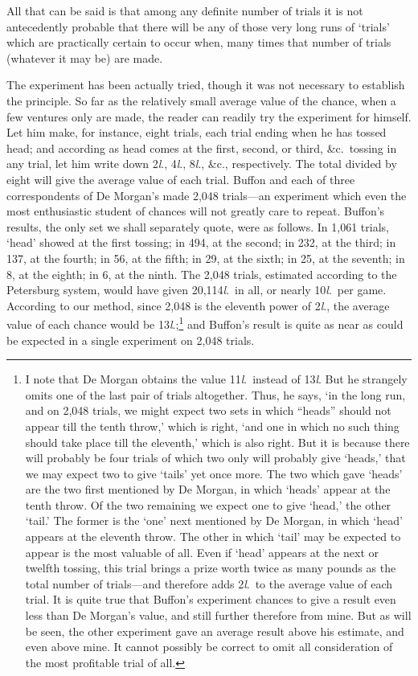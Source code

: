 \documentclass[letterpaper,12pt,oneside,openany]{memoir}
\begin{document}
All that can be said is that among any definite number
of trials it is not antecedently probable that there
will be any of those very long runs of `trials' which are
practically certain to occur when, many times that
number of trials (whatever it may be) are made.

The experiment has been actually tried, though it
was not necessary to establish the principle. So far as
the relatively small average value of the chance, when
a few ventures only are made, the reader can readily
try the experiment for himself. Let him make, for
instance, eight trials, each trial ending when he has
tossed head; and according as head comes at the first,
second, or third, \&c.\ tossing in any trial, let him write
down 2\textit{l}., 4\textit{l}., 8\textit{l}., \&c., respectively. The total divided by
eight will give the average value of each trial. Buffon
and each of three correspondents of De Morgan's made
2,048 trials---an experiment which even the most enthusiastic
student of chances will not greatly care to
repeat. Buffon's results, the only set we shall separately
quote, were as follows. In 1,061 trials, `head'
showed at the first tossing; in 494, at the second; in
232, at the third; in 137, at the fourth; in 56, at the
fifth; in 29, at the sixth; in 25, at the seventh; in 8,
at the eighth; in 6, at the ninth. The 2,048 trials,
estimated according to the Petersburg system, would
have given 20,114\textit{l}.\ in all, or nearly 10\textit{l}.\ per game.
According to our method, since 2,048 is the eleventh
power of 2\textit{l}., the average value of each chance would be
13\textit{l}.;\footnote{I note that De Morgan obtains
the value 11\textit{l}.\ instead of 13\textit{l}.
But he strangely omits one of the last pair of trials altogether.
Thus, he says, `in the long run, and on 2,048 trials, we might expect
two sets in which ``heads'' should not appear till the tenth
throw,' which is right, `and one in which no such thing should take
place till the eleventh,' which is also right. But it is because there
will probably be four trials of which two only will probably give
`heads,' that we may expect two to give `tails' yet once more. The
two which gave `heads' are the two first mentioned by De Morgan,
in which `heads' appear at the tenth throw. Of the two remaining
we expect one to give `head,' the other `tail.' The former is the
`one' next mentioned by De Morgan, in which `head' appears at
the eleventh throw. The other in which `tail' may be expected to
appear is the most valuable of all. Even if `head' appears at the
next or twelfth tossing, this trial brings a prize worth twice as many
pounds as the total number of trials---and therefore adds 2\textit{l}.\ to the
average value of each trial. It is quite true that Buffon's experiment
chances to give a result even less than De Morgan's value,
and still further therefore from mine. But as will be seen, the
other experiment gave an average result above his estimate, and
even above mine. It cannot possibly be correct to omit all consideration
of the most profitable trial of all.}
and Buffon's result is quite as near as could be
expected in a single experiment on 2,048 trials.
\end{document}
